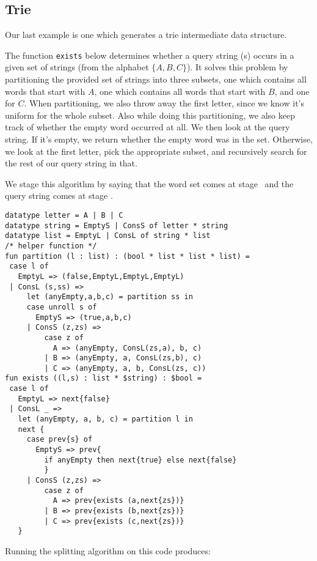 \subsection{Trie}

Our last example is one which generates a trie intermediate data structure.

The function {\tt exists} below determines whether a query string (s) occurs in a given set of strings (from the alphabet $\{A, B,C\}$).
It solves this problem by partitioning the provided set of strings into three subsets,
one which contains all words that start with $A$,
one which contains all words that start with $B$, and one for $C$.
When partitioning, we also throw away the first letter, since we know it's uniform for the whole subset.
Also while doing this partitioning, we also keep track of whether the empty word occurred at all.
We then look at the query string.  If it's empty, we return whether the empty word was in the set.
Otherwise, we look at the first letter, pick the appropriate subset, 
and recursively search for the rest of our query string in that.

We stage this algorithm by saying that the word set comes at stage \bbone\
and the query string comes at stage \bbtwo.

\begin{lstlisting} 
datatype letter = A | B | C
datatype string = EmptyS | ConsS of letter * string
datatype list = EmptyL | ConsL of string * list
/* helper function */
fun partition (l : list) : (bool * list * list * list) =
 case l of
   EmptyL => (false,EmptyL,EmptyL,EmptyL)
 | ConsL (s,ss) =>
     let (anyEmpty,a,b,c) = partition ss in
     case unroll s of
       EmptyS => (true,a,b,c)
     | ConsS (z,zs) =>
         case z of 
           A => (anyEmpty, ConsL(zs,a), b, c) 
         | B => (anyEmpty, a, ConsL(zs,b), c) 
         | C => (anyEmpty, a, b, ConsL(zs, c))
fun exists ((l,s) : list * $string) : $bool =
 case l of 
   EmptyL => next{false} 
 | ConsL _ => 
   let (anyEmpty, a, b, c) = partition l in
   next {
     case prev{s} of
       EmptyS => prev{
         if anyEmpty then next{true} else next{false}
         }
     | ConsS (z,zs) =>
         case z of
           A => prev{exists (a,next{zs})}
         | B => prev{exists (b,next{zs})} 
         | C => prev{exists (c,next{zs})}
   }
\end{lstlisting}

\noindent
Running the splitting algorithm on this code produces:

